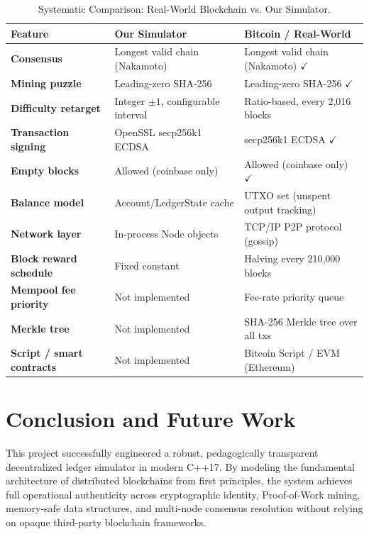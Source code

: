 \documentclass[11pt,a4paper]{report}
\begin{document}
\begin{table}[H]
\centering
\small
\renewcommand{\arraystretch}{1.3}
\begin{tabularx}{\textwidth}{lXX}
\toprule
\textbf{Feature} & \textbf{Our Simulator} & \textbf{Bitcoin / Real-World} \\
\midrule
\textbf{Consensus} & Longest valid chain (Nakamoto) & Longest valid chain (Nakamoto) $\checkmark$ \\
\textbf{Mining puzzle} & Leading-zero SHA-256 & Leading-zero SHA-256 $\checkmark$ \\
\textbf{Difficulty retarget} & Integer $\pm 1$, configurable interval & Ratio-based, every 2,016 blocks \\
\textbf{Transaction signing} & OpenSSL secp256k1 ECDSA & secp256k1 ECDSA $\checkmark$ \\
\textbf{Empty blocks} & Allowed (coinbase only) & Allowed (coinbase only) $\checkmark$ \\
\textbf{Balance model} & Account/LedgerState cache & UTXO set (unspent output tracking) \\
\textbf{Network layer} & In-process Node objects & TCP/IP P2P protocol (gossip) \\
\textbf{Block reward schedule} & Fixed constant & Halving every 210,000 blocks \\
\textbf{Mempool fee priority} & Not implemented & Fee-rate priority queue \\
\textbf{Merkle tree} & Not implemented & SHA-256 Merkle tree over all txs \\
\textbf{Script / smart contracts} & Not implemented & Bitcoin Script / EVM (Ethereum) \\
\bottomrule
\end{tabularx}
\caption{Systematic Comparison: Real-World Blockchain vs. Our Simulator.}
\label{tab:real_world_comparison}
\end{table}

\vfill

\clearpage

\section{Conclusion and Future Work}

This project successfully engineered a robust, pedagogically transparent decentralized ledger simulator in modern C++17. By modeling the fundamental architecture of distributed blockchains from first principles, the system achieves full operational authenticity across cryptographic identity, Proof-of-Work mining, memory-safe data structures, and multi-node consensus resolution without relying on opaque third-party blockchain frameworks.
\end{document}
